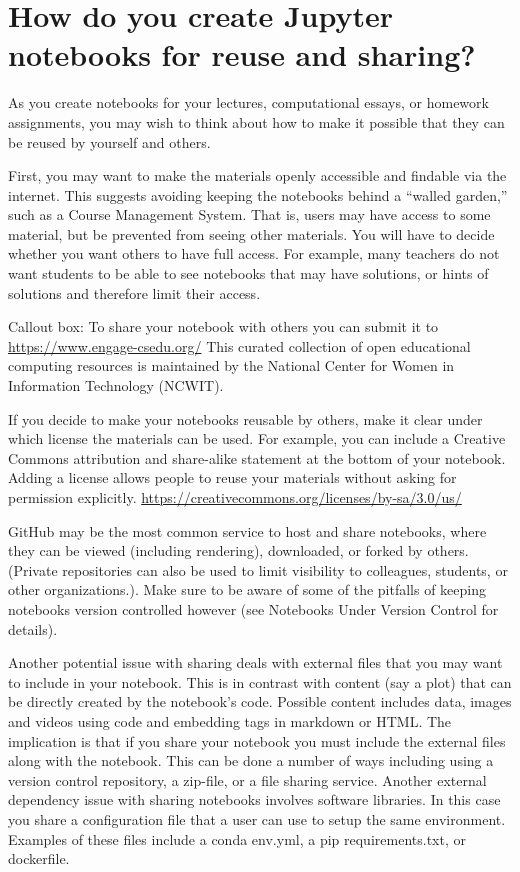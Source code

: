 \documentclass[]{book}
\begin{document}
\section{How do you create Jupyter notebooks for reuse and
sharing?}\label{how-do-you-create-jupyter-notebooks-for-reuse-and-sharing}

As you create notebooks for your lectures, computational essays, or
homework assignments, you may wish to think about how to make it
possible that they can be reused by yourself and others.

First, you may want to make the materials openly accessible and findable
via the internet. This suggests avoiding keeping the notebooks behind a
``walled garden,'' such as a Course Management System. That is, users
may have access to some material, but be prevented from seeing other
materials. You will have to decide whether you want others to have full
access. For example, many teachers do not want students to be able to
see notebooks that may have solutions, or hints of solutions and
therefore limit their access.

Callout box: To share your notebook with others you can submit it to
\url{https://www.engage-csedu.org/} This curated collection of open
educational computing resources is maintained by the National Center for
Women in Information Technology (NCWIT).

If you decide to make your notebooks reusable by others, make it clear
under which license the materials can be used. For example, you can
include a Creative Commons attribution and share-alike statement at the
bottom of your notebook. Adding a license allows people to reuse your
materials without asking for permission explicitly.
\url{https://creativecommons.org/licenses/by-sa/3.0/us/}

GitHub may be the most common service to host and share notebooks, where
they can be viewed (including rendering), downloaded, or forked by
others. (Private repositories can also be used to limit visibility to
colleagues, students, or other organizations.). Make sure to be aware of
some of the pitfalls of keeping notebooks version controlled however
(see Notebooks Under Version Control for details).

Another potential issue with sharing deals with external files that you
may want to include in your notebook. This is in contrast with content
(say a plot) that can be directly created by the notebook's code.
Possible content includes data, images and videos using code and
embedding tags in markdown or HTML. The implication is that if you share
your notebook you must include the external files along with the
notebook. This can be done a number of ways including using a version
control repository, a zip-file, or a file sharing service. Another
external dependency issue with sharing notebooks involves software
libraries. In this case you share a configuration file that a user can
use to setup the same environment. Examples of these files include a
conda env.yml, a pip requirements.txt, or dockerfile.
\end{document}
